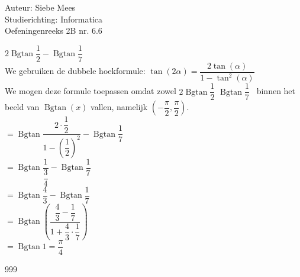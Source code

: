 \documentclass[a4paper]{article}
\newcommand{\Bgtan}{\operatorname{Bgtan}}
\begin{document}
  
\noindent \large Auteur: Siebe Mees \\
\noindent \large Studierichting: Informatica\\
\noindent \large Oefeningenreeks 2B nr. 6.6\\

\medskip

\normalsize


$2\Bgtan\dfrac{1}{2} - \Bgtan\dfrac{1}{7}$\\

We gebruiken de dubbele hoekformule: $\tan(2\alpha) = \dfrac{2\tan(\alpha)}{1 - \tan^2(\alpha)}$\\

We mogen deze formule toepassen omdat zowel $2\Bgtan\dfrac{1}{2}$  $\Bgtan\dfrac{1}{7}$ \ binnen het beeld van $\Bgtan(x)$ vallen, namelijk $\left(-\dfrac{\pi}{2}, \dfrac{\pi}{2}\right)$. \\

$ = \Bgtan\dfrac{2 \cdot \dfrac{1}{2}}{1 - \left(\dfrac{1}{2}\right)^2} - \Bgtan\dfrac{1}{7}$\\

$= \Bgtan\dfrac{1}{\dfrac{3}{4}} - \Bgtan\dfrac{1}{7}$\\

$= \Bgtan\dfrac{4}{3} - \Bgtan\dfrac{1}{7}$\\

$= \Bgtan\left(\dfrac{\dfrac{4}{3} - \dfrac{1}{7}}{1 + \dfrac{4}{3} \cdot \dfrac{1}{7}}\right)$\\

$= \Bgtan 1 = \dfrac{\pi}{4}$


\begin{thebibliography}{999}

\end{thebibliography}
\end{document}
